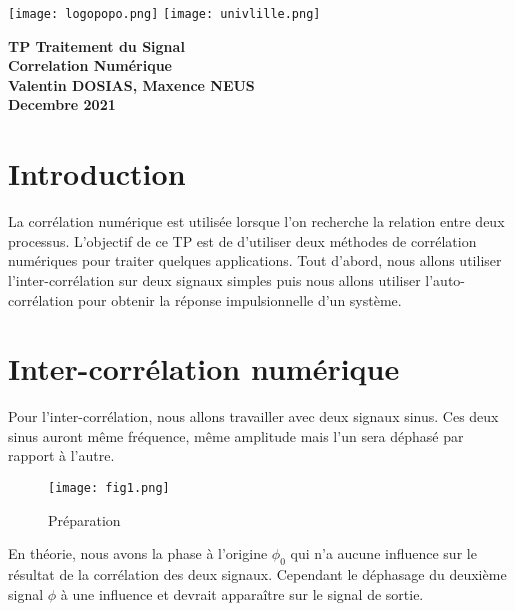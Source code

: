 \documentclass[oneside,a4paper,12pt]{article}
\begin{document}
	\begin{titlepage}
		\texttt{[image: logopopo.png]}
		\hspace*{\fill}
		\texttt{[image: univlille.png]}
		
		\begin{center}
			\vspace{1cm}
			\textbf{TP Traitement du Signal}\\
			\textbf{Correlation Numérique}\\
			\vspace{1cm}
			\textbf{Valentin DOSIAS, Maxence NEUS}\\
			\vspace{3cm}
			\vspace{\fill}
			\textbf{Decembre 2021}\\
		\end{center}
	\end{titlepage}
	
	\tableofcontents
	\newpage
	
	\section{Introduction}
	
	La corrélation numérique est utilisée lorsque l’on recherche la relation entre deux processus. L’objectif de ce TP est de d’utiliser deux méthodes de corrélation numériques pour traiter quelques applications. Tout d’abord, nous allons utiliser l’inter-corrélation sur deux signaux simples puis nous allons utiliser l’auto-corrélation pour obtenir la réponse impulsionnelle d’un système.
	
	\section{Inter-corrélation numérique}
	
	Pour l’inter-corrélation, nous allons travailler avec deux signaux sinus. Ces deux sinus auront même fréquence, même amplitude mais l’un sera déphasé par rapport à l’autre.
	
	\begin{figure}[h]
		\centering
		\texttt{[image: fig1.png]}
		\caption{Préparation}
	\end{figure}
	
	En théorie, nous avons la phase à l’origine $\phi_{0}$ qui n’a aucune influence sur le résultat de la corrélation des deux signaux. Cependant le déphasage du deuxième signal $\phi$ à une influence et devrait apparaître sur le signal de sortie.\\
	
\end{document}
